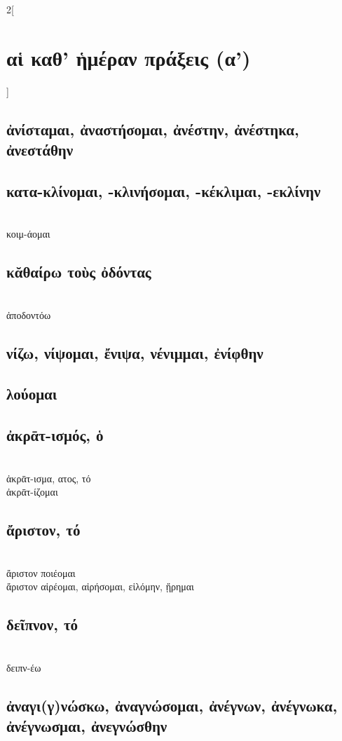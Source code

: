 \documentclass{book}
\begin{document}
\begin{multicols}{2}[\section{αἱ καθ' ἡμέραν πράξεις (α')}]
\subsection{ἀνίσταμαι, ἀναστήσομαι, ἀνέστην, ἀνέστηκα, ἀνεστάθην}
\subsection{κατα-κλίνομαι, -κλινήσομαι, -κέκλιμαι, -εκλίνην}
 ~\\
κοιμ-άομαι 
\subsection{κᾰθαίρω τοὺς ὀδόντας}  ~\\
ἀποδοντόω 
\subsection{νίζω, νίψομαι, ἔνιψα, νένιμμαι, ἐνίφθην} 
\subsection{λούομαι} 
\subsection{ἀκρᾱτ-ισμός, ὁ}  ~\\
ἀκρᾱτ-ισμα, ατος, τό  ~\\
ἀκρᾱτ-ίζομαι 
\subsection{ἄριστον, τό}  ~\\
ἄριστον ποιέομαι   ~\\
ἄριστον αἱρέομαι, αἱρήσομαι, εἱλόμην, ᾕρημαι   
\subsection{δεῖπνον, τό}  ~\\
δειπν-έω 
\subsection{ἀναγι(γ)νώσκω, ἀναγνώσομαι, ἀνέγνων, ἀνέγνωκα, ἀνέγνωσμαι, ἀνεγνώσθην} 
~
\end{multicols}
\end{document}
